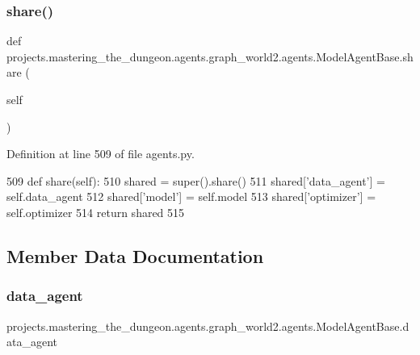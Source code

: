 \subsubsection{\texorpdfstring{share()}{share()}}
{\footnotesize\ttfamily def projects.\+mastering\+\_\+the\+\_\+dungeon.\+agents.\+graph\+\_\+world2.\+agents.\+Model\+Agent\+Base.\+share (\begin{DoxyParamCaption}\item[{}]{self }\end{DoxyParamCaption})}



Definition at line 509 of file agents.\+py.


\begin{DoxyCode}
509     \textcolor{keyword}{def }share(self):
510         shared = super().share()
511         shared[\textcolor{stringliteral}{'data\_agent'}] = self.data\_agent
512         shared[\textcolor{stringliteral}{'model'}] = self.model
513         shared[\textcolor{stringliteral}{'optimizer'}] = self.optimizer
514         \textcolor{keywordflow}{return} shared
515 
\end{DoxyCode}


\subsection{Member Data Documentation}
\mbox{\label{classprojects_1_1mastering__the__dungeon_1_1agents_1_1graph__world2_1_1agents_1_1ModelAgentBase_a229b7901e20dced7e3b3c3e2d381d2ce}} 
\subsubsection{\texorpdfstring{data\+\_\+agent}{data\_agent}}
{\footnotesize\ttfamily projects.\+mastering\+\_\+the\+\_\+dungeon.\+agents.\+graph\+\_\+world2.\+agents.\+Model\+Agent\+Base.\+data\+\_\+agent}



